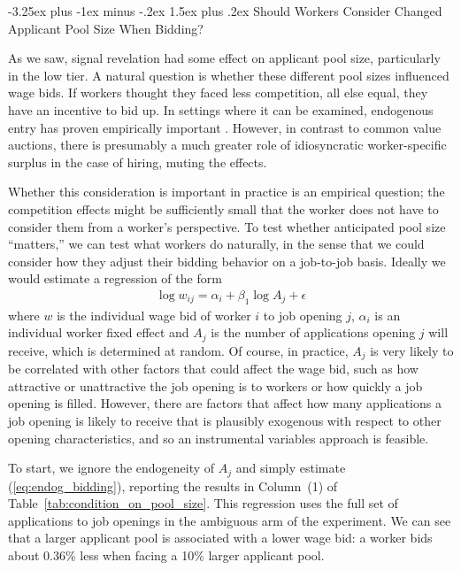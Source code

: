 \documentclass[12pt]{article}
\makeatletter
\renewcommand{\subsection}{%
  \@startsection{subsection}{2}{\z@}%
  {-3.25ex plus -1ex minus -.2ex}%
  {1.5ex plus .2ex}%
  {\normalfont\large\bfseries}%
}
\makeatother
\begin{document}
\bigskip

\subsection{Should Workers Consider Changed Applicant Pool Size When Bidding?} \label{supp_app:condition_on_pool_size}

As we saw, signal revelation had some effect on applicant pool size, particularly in the low tier.
A natural question is whether these different pool sizes influenced wage bids.
If workers thought they faced less competition, all else equal, they have an incentive to bid up.
In settings where it can be examined, endogenous entry has proven empirically important \citep{bajari2003winner}. However, in contrast to common value auctions, there is presumably a much greater role of idiosyncratic worker-specific surplus in the case of hiring, muting the effects.  

Whether this consideration is important in practice is an empirical question; the competition effects might be sufficiently small that the worker does not have to consider them from a worker's perspective.
To test whether anticipated pool size ``matters,'' we can test what workers do naturally, in the sense that we could consider how they adjust their bidding behavior on a job-to-job basis. 
Ideally we would estimate a regression of the form 
\begin{align} \label{eq:endog_bidding}
  \log w_{ij} = \alpha_i + \beta_1 \log A_{j} + \epsilon
\end{align} 
where $w$ is the individual wage bid of worker $i$ to job opening $j$, $\alpha_i$ is an individual worker fixed effect and $A_j$ is the number of applications opening $j$ will receive, which is determined at random.
Of course, in practice, $A_j$ is very likely to be correlated with other factors that could affect the wage bid, such as how attractive or unattractive the job opening is to workers or how quickly a job opening is filled.
However, there are factors that affect how many applications a job opening is likely to receive that is plausibly exogenous with respect to other opening characteristics, and so an instrumental variables approach is feasible. 

To start, we ignore the endogeneity of $A_j$ and simply estimate (\ref{eq:endog_bidding}), reporting the results in Column~(1) of Table~\ref{tab:condition_on_pool_size}.
This regression uses the full set of applications to job openings in the ambiguous arm of the experiment.
We can see that a larger applicant pool is associated with a lower wage bid: a worker bids about 0.36\% less when facing a 10\% larger applicant pool. 
\end{document}
